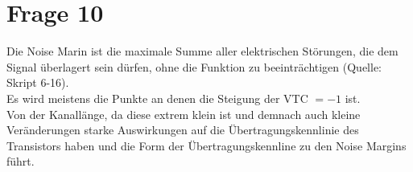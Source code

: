 \documentclass[a4paper]{scrartcl}
\begin{document}
\section*{Frage 10}
Die Noise Marin ist die maximale Summe aller elektrischen Störungen, die dem Signal überlagert sein dürfen, ohne die Funktion zu beeinträchtigen (Quelle: Skript 6-16).
~\\
Es wird meistens die Punkte an denen die Steigung der VTC $= -1$ ist.
~\\
Von der Kanallänge, da diese extrem klein ist und demnach auch kleine Veränderungen starke Auswirkungen auf die Übertragungskennlinie des Transistors haben und die Form der Übertragungskennline zu den Noise Margins führt.
~\\
~\\
\end{document}

